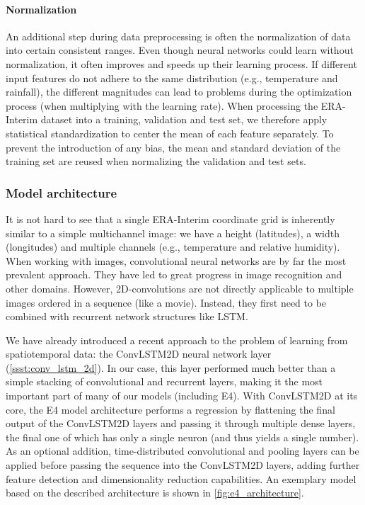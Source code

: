 \paragraph{Normalization} An additional step during data preprocessing is often the normalization of data into certain consistent ranges. Even though neural networks could learn without normalization, it often improves and speeds up their learning process. If different input features do not adhere to the same distribution (e.g., temperature and rainfall), the different magnitudes can lead to problems during the optimization process (when multiplying with the learning rate). When processing the ERA-Interim dataset into a training, validation and test set, we therefore apply statistical standardization to center the mean of each feature separately. To prevent the introduction of any bias, the mean and standard deviation of the training set are reused when normalizing the validation and test sets.

\clearpage
\subsubsection{Model architecture}
It is not hard to see that a single ERA-Interim coordinate grid is inherently similar to a simple multichannel image: we have a height (latitudes), a width (longitudes) and multiple channels (e.g., temperature and relative humidity). When working with images, convolutional neural networks are by far the most prevalent approach. They have led to great progress in image recognition and other domains. However, 2D-convolutions are not directly applicable to multiple images ordered in a sequence (like a movie). Instead, they first need to be combined with recurrent network structures like LSTM.

We have already introduced a recent approach to the problem of learning from spatiotemporal data: the ConvLSTM2D neural network layer (\cref{ssst:conv_lstm_2d}). In our case, this layer performed much better than a simple stacking of convolutional and recurrent layers, making it the most important part of many of our models (including E4). With ConvLSTM2D at its core, the E4 model architecture performs a regression by flattening the final output of the ConvLSTM2D layers and passing it through multiple dense layers, the final one of which has only a single neuron (and thus yields a single number). As an optional addition, time-distributed convolutional and pooling layers can be applied before passing the sequence into the ConvLSTM2D layers, adding further feature detection and dimensionality reduction capabilities. An exemplary model based on the described architecture is shown in \cref{fig:e4_architecture}.

